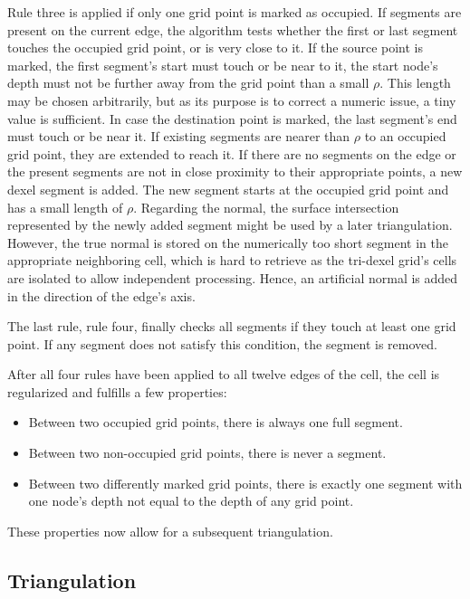 Rule three is applied if only one grid point is marked as occupied.
If segments are present on the current edge, the algorithm tests whether the first or last segment touches the occupied grid point, or is very close to it.
If the source point is marked, the first segment's start must touch or be near to it, \ie the start node's depth must not be further away from the grid point than a small $\rho$.
This length may be chosen arbitrarily, but as its purpose is to correct a numeric issue, a tiny value is sufficient.
In case the destination point is marked, the last segment's end must touch or be near it.
If existing segments are nearer than $\rho$ to an occupied grid point, they are extended to reach it.
If there are no segments on the edge or the present segments are not in close proximity to their appropriate points, a new dexel segment is added.
The new segment starts at the occupied grid point and has a small length of $\rho$.
Regarding the normal, the surface intersection represented by the newly added segment might be used by a later triangulation.
However, the true normal is stored on the numerically too short segment in the appropriate neighboring cell, which is hard to retrieve as the tri-dexel grid's cells are isolated to allow independent processing.
Hence, an artificial normal is added in the direction of the edge's axis.

The last rule, rule four, finally checks all segments if they touch at least one grid point.
If any segment does not satisfy this condition, the segment is removed.

After all four rules have been applied to all twelve edges of the cell, the cell is regularized and fulfills a few properties:
\begin{itemize}
	\item Between two occupied grid points, there is always one full segment.
	\item Between two non-occupied grid points, there is never a segment.
	\item Between two differently marked grid points, there is exactly one segment with one node's depth not equal to the depth of any grid point.
\end{itemize}
These properties now allow for a subsequent triangulation.


\subsection{Triangulation}
\label{sec:tri_dexel_triangulation}

